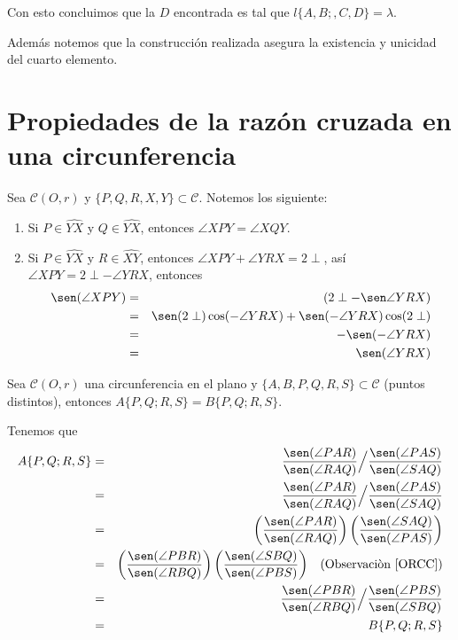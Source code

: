 Con esto concluimos que la $D$ encontrada es tal que $l\{A,B;,C,D\}=\lambda$.

Además notemos que la construcción realizada asegura la existencia y unicidad del cuarto elemento.
\section{Propiedades de la razón cruzada en una circunferencia}
\begin{obs}\label{ORCC}
Sea $\mathcal{C}(O,r)$ y $\{P,Q,R,X,Y\}\subset \mathcal{C}$. Notemos los siguiente:
\begin{enumerate}
\item Si $P\in\widehat{YX}$ y $Q\in\widehat{YX}$, entonces $\angle XPY=\angle XQY$.
\item Si $P\in\widehat{YX}$ y $R\in\widehat{XY}$, entonces $\angle XPY+\angle YRX=2\perp$, así $\angle XPY=2\perp -\angle YRX$, entonces 
\begin{eqnarray*}
\sen(\angle XPY)
&=& (2\perp -\sen\angle YRX)\\
&=& \sen(2\perp)\cos(-\angle YRX)+\sen(-\angle YRX)\cos(2\perp)\\
&=& -\sen(-\angle YRX)\\
&=& \sen(\angle YRX)\\
\end{eqnarray*}
\end{enumerate}
\end{obs}

\begin{prop}\label{PPRCC}
Sea $\mathcal{C}(O,r)$ una circunferencia en el plano y $\{A,B,P,Q,R,S\}\subset\mathcal{C}$ (puntos distintos), entonces $A\{P,Q;R,S\}=B\{P,Q;R,S\}$.
\end{prop}
\begin{pba}
Tenemos que 
\begin{eqnarray*}
A\{P,Q;R,S\}
&=& \frac{\sen(\angle PAR)}{\sen(\angle RAQ)}\Big/\frac{\sen(\angle PAS)}{\sen(\angle SAQ)}\\
&=& \frac{\sen(\angle PAR)}{\sen(\angle RAQ)}\Big/\frac{\sen(\angle PAS)}{\sen(\angle SAQ)}\\
&=& \left(\frac{\sen(\angle PAR)}{\sen(\angle RAQ)}\right)\left(\frac{\sen(\angle SAQ)}{\sen(\angle PAS)}\right)\\
&=& \left(\frac{\sen(\angle PBR)}{\sen(\angle RBQ)}\right)\left(\frac{\sen(\angle SBQ)}{\sen(\angle PBS)}\right)\;\;\;(\text{Observaciòn}~\ref{ORCC})\\ 
&=& \frac{\sen(\angle PBR)}{\sen(\angle RBQ)}\Big/\frac{\sen(\angle PBS)}{\sen(\angle SBQ)}\\
&=& B\{P,Q;R,S\}\\
\end{eqnarray*}
\end{pba}
